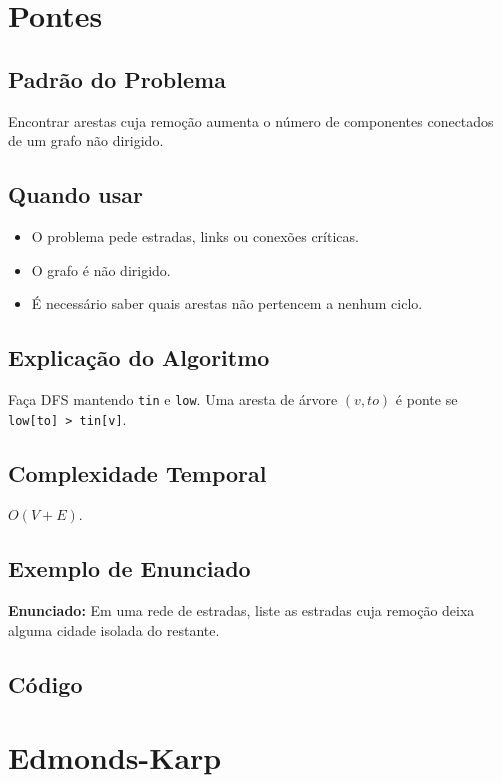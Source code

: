 \section{Pontes}

\subsection{Padrão do Problema}
Encontrar arestas cuja remoção aumenta o número de componentes conectados de um grafo não dirigido.

\subsection{Quando usar}
\begin{itemize}[nosep]
  \item O problema pede estradas, links ou conexões críticas.
  \item O grafo é não dirigido.
  \item É necessário saber quais arestas não pertencem a nenhum ciclo.
\end{itemize}

\subsection{Explicação do Algoritmo}
Faça DFS mantendo \texttt{tin} e \texttt{low}. Uma aresta de árvore $(v,to)$ é ponte se \texttt{low[to] > tin[v]}.

\subsection{Complexidade Temporal}
$O(V + E)$.

\subsection{Exemplo de Enunciado}
\begin{exemplodiabox}
\textbf{Enunciado:} Em uma rede de estradas, liste as estradas cuja remoção deixa alguma cidade isolada do restante.
\end{exemplodiabox}

\subsection{Código}

\section{Edmonds-Karp}

